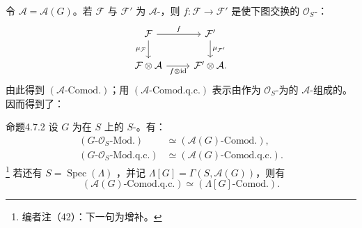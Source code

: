 令 $\mathcal A=\mathcal A(G)$。若 $\mathcal F$ 与 $\mathcal F'$ 为 $\mathcal A$-，则 $f:\mathcal F\to\mathcal F'$ 是使下图交换的 $\mathcal O_S$-：
\[
\begin{tikzcd}
\mathcal F\arrow[r,"{f}"]\arrow[d,"{\mu_{\mathcal F}}"']&\mathcal F'\arrow[d,"{\mu_{\mathcal F'}}"]\\
\mathcal F\otimes\mathcal A\arrow[r,"{f\otimes\mathrm{id}}"']&\mathcal F'\otimes\mathcal A.
\end{tikzcd}
\]
由此得到 $(\mathcal A\text{-}\mathrm{Comod.})$；用 $(\mathcal A\text{-}\mathrm{Comod.q.c.})$ 表示由作为 $\mathcal O_S$-为的 $\mathcal A$-组成的。因而得到了：
\begin{SGAresult}{命题}{4.7.2}
设 $G$ 为在 $S$ 上的 $S$-。有：
\[
\begin{aligned}
(G\text{-}\mathcal O_S\text{-}\mathrm{Mod.})&\simeq(\mathcal A(G)\text{-}\mathrm{Comod.}),\\
(G\text{-}\mathcal O_S\text{-}\mathrm{Mod.q.c.})&\simeq(\mathcal A(G)\text{-}\mathrm{Comod.q.c.}).
\end{aligned}
\]
\footnote{编者注（42）：下一句为增补。} 若还有 $S=\operatorname{Spec}(\Lambda)$ ，并记 $\Lambda[G]=\Gamma(S,\mathcal A(G))$，则有
\[
(\mathcal A(G)\text{-}\mathrm{Comod.q.c.})\simeq(\Lambda[G]\text{-}\mathrm{Comod.}).
\]
\end{SGAresult}

